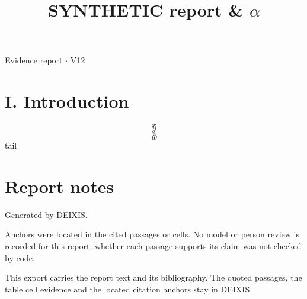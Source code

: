 \documentclass[journal]{IEEEtran}
\begin{document}
\title{SYNTHETIC report \& \ensuremath{\alpha}}

\maketitle

\noindent Evidence report \ensuremath{\cdot} V12

\section*{I. Introduction}

\begin{equation*}
x
\end{equation*}
\begin{equation*}
y
\end{equation*}
\cite{Synth26}
\begin{equation*}
z
\end{equation*}
\cite{Synth26}
\begin{equation*}
w
\end{equation*}
tail \cite{Synth26}

\section*{Report notes}

Generated by DEIXIS.

Anchors were located in the cited passages or cells. No model or person review is recorded for this report; whether each passage supports its claim was not checked by code.

This export carries the report text and its bibliography. The quoted passages, the table cell evidence and the located citation anchors stay in DEIXIS.




\end{document}
